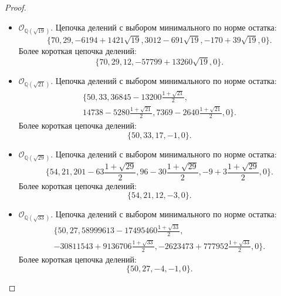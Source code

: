 \documentclass[_00_dissertation.tex]{subfiles}
\begin{document}
\begin{proof}
\begin{itemize}
        \item $\mathcal{O}_{\mathbb{Q}(\sqrt{19})}$.
        Цепочка делений с выбором минимального по норме остатка:
        \begin{equation*}
            \{70, 29, -6194+1421\sqrt{19}, 3012-691\sqrt{19}, -170+39\sqrt{19}, 0\}.
        \end{equation*}
        Более короткая цепочка делений:
        \begin{equation*}
            \{70, 29, 12, -57799+13260\sqrt{19}, 0\}.
        \end{equation*}
    
        \item $\mathcal{O}_{\mathbb{Q}(\sqrt{21})}$.
        Цепочка делений с выбором минимального по норме остатка:
        \begin{multline*}
          \{50, 33, 36845-13200\frac{1+\sqrt{21}}{2},\\
          14738-5280\frac{1+\sqrt{21}}{2}, 7369-2640\frac{1+\sqrt{21}}{2}, 0\}.
        \end{multline*}
        Более короткая цепочка делений:
        \begin{equation*}
            \{50, 33, 17, -1, 0\}.
        \end{equation*}
    
        \item $\mathcal{O}_{\mathbb{Q}(\sqrt{29})}$.
        Цепочка делений с выбором минимального по норме остатка:
        \begin{equation*}
            \{54, 21, 201-63\frac{1+\sqrt{29}}{2}, 96-30\frac{1+\sqrt{29}}{2}, -9+3\frac{1+\sqrt{29}}{2}, 0\}.
        \end{equation*}
        Более короткая цепочка делений:
        \begin{equation*}
            \{54, 21, 12, -3, 0\}.
        \end{equation*}
    
        \item $\mathcal{O}_{\mathbb{Q}(\sqrt{33})}$.
        Цепочка делений с выбором минимального по норме остатка:
        \begin{multline*}
            \{50, 27, 58999613-17495460\frac{1+\sqrt{33}}{2},\\
            -30811543+9136706\frac{1+\sqrt{33}}{2}, -2623473+777952\frac{1+\sqrt{33}}{2}, 0\}.
        \end{multline*}
        Более короткая цепочка делений:
        \begin{equation*}
            \{50, 27, -4, -1, 0\}.
        \end{equation*}
    

\end{itemize}
\end{proof}
\end{document}
